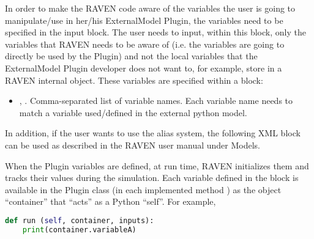 In order to make the RAVEN code aware of the variables the user is going to
manipulate/use in her/his ExternalModel Plugin, the variables need to be specified
in the  input block.
%
The user needs to input, within this block, only the variables that RAVEN needs
to be aware of (i.e. the variables are going to directly be used by the Plugin)
and not the local variables that the ExternalModel Plugin developer does not want to,
for example, store in a RAVEN internal object.
%
These variables are specified within a  block:
\begin{itemize}
  \item {}, .
  Comma-separated list of variable names.
  Each variable name needs to match a variable used/defined in the external python
  model.
\end{itemize}

In addition, if the user wants to use the alias system, the following XML block can be used as
described in the RAVEN user manual under Models.

When the Plugin variables are defined, at run time, RAVEN initializes
them and tracks their values during the simulation.
%
Each variable defined in the  block is available in the
Plugin class (in each implemented method ) as the object ``container'' that ``acts''
as a Python ``self''. For example,
\begin{lstlisting}[language=python]
  def run (self, container, inputs):
    print(container.variableA)
\end{lstlisting}

